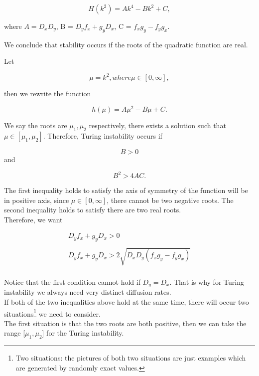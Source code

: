\documentclass[12pt]{article}
\begin{document}
$$
H(k^2)=Ak^4-Bk^2+C,
$$
\vspace{12pt}

\noindent where $A=D_x D_y$, B = $D_y f_x+g_y D_x$, C = $f_x g_y-f_y g_x$.
\vspace{12pt}

\noindent We conclude that stability occurs if the roots of the quadratic function are real.
\vspace{12pt}

\noindent Let

$$
\mu=k^2,where \mu\in[0,\infty],
$$
\vspace{12pt}

\noindent then we rewrite the function

$$
h(\mu)=A\mu^{2}-B\mu+C.
$$
\vspace{12pt}

\noindent We say the roots are $\mu_1, \mu_2$ respectively, there exists a solution such that $\mu \in [\mu_1,\mu_2]$. Therefore, Turing instability occurs if

$$
B>0 $$
and

$$
B^2>4AC.
$$
\vspace{12pt}

\noindent The first inequality holds to satisfy the axis of symmetry of the function will be in positive axis, since $\mu\in\left[0,\infty\right]$, there cannot be two negative roots. The second inequality holds to satisfy there are two real roots.
\vspace{12pt}\\
Therefore, we want 
\vspace{12pt}

$$
\begin{array}{c}D_y f_x+g_y D_x>0\\ \\ D_y f_x +g_y D_x>2\sqrt{D_x D_y(f_x g_y-f_y g_x)}\\ \end{array}
$$
\vspace{12pt}

\noindent Notice that the first condition cannot hold if $D_y = D_x$. That is why for Turing instability we always need very distinct diffusion rates. 
\vspace{24pt}\\
If both of the two inequalities above hold at the same time, there will occur two situations\footnote{ Two situations: the pictures of both two situations are just examples which are generated by randomly
exact values.} we need to consider.
\vspace{24pt}\\
The first situation is that the two roots are both positive, then we can take the range [$\mu_1,\mu_2$] for the Turing instability.
\vspace{12pt}\\
\end{document}
